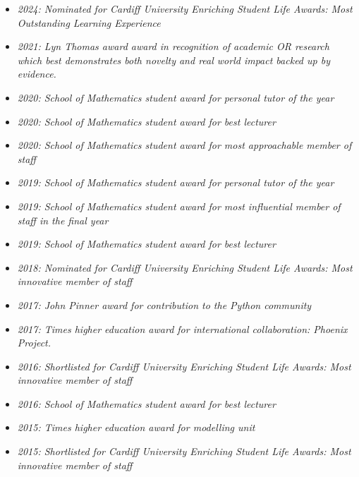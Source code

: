 \documentclass[10pt]{res} %
\begin{document}
\begin{resume}
\begin{itemize}
    \item {\sl 2024: Nominated for Cardiff University Enriching Student Life Awards: Most Outstanding Learning Experience}

    \item {\sl 2021: Lyn Thomas award award in recognition of academic OR research which best demonstrates both novelty and real world impact backed up by evidence.}

    \item {\sl 2020: School of Mathematics student award for personal tutor of the year}

    \item {\sl 2020: School of Mathematics student award for best lecturer}

    \item {\sl 2020: School of Mathematics student award for most approachable member of staff}

    \item {\sl 2019: School of Mathematics student award for personal tutor of the year}

    \item {\sl 2019: School of Mathematics student award for most influential member of staff in the final year}

    \item {\sl 2019: School of Mathematics student award for best lecturer}

    \item {\sl 2018: Nominated for Cardiff University Enriching Student Life Awards: Most innovative member of staff}

    \item {\sl 2017: John Pinner award for contribution to the Python community}

    \item {\sl 2017: Times higher education award for international collaboration: Phoenix Project.}

    \item {\sl 2016: Shortlisted for Cardiff University Enriching Student Life Awards: Most innovative member of staff}

    \item {\sl 2016: School of Mathematics student award for best lecturer}

    \item {\sl 2015: Times higher education award for modelling unit}

    \item {\sl 2015: Shortlisted for Cardiff University Enriching Student Life Awards: Most innovative member of staff}


\end{itemize}
\end{resume}
\end{document}
